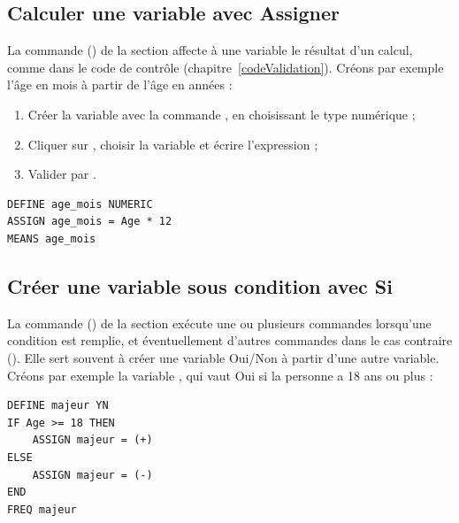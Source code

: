 \subsection{Calculer une variable avec Assigner}

La commande  () de la section  affecte à une variable le résultat d'un calcul, comme dans le code de contrôle (chapitre~\ref{codeValidation}). Créons par exemple l'âge en mois à partir de l'âge en années :
\begin{enumerate}
	\item Créer la variable  avec la commande , en choisissant le type numérique ;
	\item Cliquer sur , choisir la variable  et écrire l'expression  ;
	\item Valider par .
\end{enumerate}

\begin{tcolorbox}
	\begin{lstlisting}[language=EPIscript, style=mystyle, caption={Calcul d'une nouvelle variable}, label=lst:assignclassic]
DEFINE age_mois NUMERIC
ASSIGN age_mois = Age * 12
MEANS age_mois
	\end{lstlisting}
\end{tcolorbox}

\subsection{Créer une variable sous condition avec Si}

La commande  () de la section  exécute une ou plusieurs commandes lorsqu'une condition est remplie, et éventuellement d'autres commandes dans le cas contraire (). Elle sert souvent à créer une variable Oui/Non à partir d'une autre variable. Créons par exemple la variable , qui vaut Oui si la personne a 18 ans ou plus :

\begin{tcolorbox}
	\begin{lstlisting}[language=EPIscript, style=mystyle, caption={Création d'une variable Oui/Non sous condition}, label=lst:ifclassic]
DEFINE majeur YN
IF Age >= 18 THEN
	ASSIGN majeur = (+)
ELSE
	ASSIGN majeur = (-)
END
FREQ majeur
	\end{lstlisting}
\end{tcolorbox}

